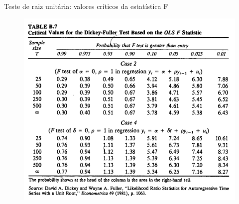 \documentclass[11pt]{beamer}
\begin{document}
\begin{frame}{Teste de raiz unitária: valores críticos da estatística F}
	\begin{figure}
		\includegraphics[scale=0.5]{graficos/valores_criticos_F.png}
	\end{figure}
\end{frame}
\end{document}
